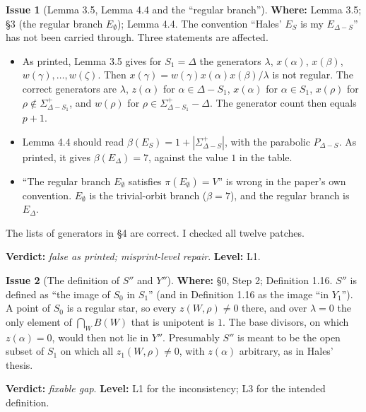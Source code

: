 \documentclass[12pt,letterpaper]{article}
\newcommand{\Lv}[1]{\textsf{L#1}}
\newcommand{\verdict}[1]{\textbf{Verdict:} \emph{#1}.}
\newcommand{\level}[1]{\textbf{Level:} #1.}
\newcommand{\loc}[1]{\textbf{Where:} #1.}
\theoremstyle{definition}
\newtheorem{issue}{Issue}[section]
\begin{document}
\begin{issue}[Lemma 3.5, Lemma 4.4 and the ``regular branch'']\label{iss:richardson}
\loc{Lemma 3.5; \S3 (the regular branch $E_\emptyset$); Lemma 4.4}
The convention ``Hales' $E_S$ is my $E_{\Delta-S}$'' has not been carried
through. Three statements are affected.
\begin{itemize}
\item As printed, Lemma 3.5 gives for $S_1=\Delta$ the generators $\lambda$,
$x(\alpha)$, $x(\beta)$, $w(\gamma),\dots,w(\zeta)$. Then
$x(\gamma)=w(\gamma)x(\alpha)x(\beta)/\lambda$ is not regular. The correct
generators are $\lambda$, $z(\alpha)$ for $\alpha\in\Delta-S_1$, $x(\alpha)$
for $\alpha\in S_1$, $x(\rho)$ for $\rho\notin\Sigma^+_{\Delta-S_1}$, and
$w(\rho)$ for $\rho\in\Sigma^+_{\Delta-S_1}-\Delta$. The generator count then
equals $p+1$.
\item Lemma 4.4 should read $\beta(E_S)=1+|\Sigma^+_{\Delta-S}|$, with the
parabolic $P_{\Delta-S}$. As printed, it gives $\beta(E_\Delta)=7$, against
the value $1$ in the table.
\item ``The regular branch $E_\emptyset$ satisfies $\pi(E_\emptyset)=V$'' is
wrong in the paper's own convention. $E_\emptyset$ is the trivial-orbit branch
($\beta=7$), and the regular branch is $E_\Delta$.
\end{itemize}
The lists of generators in \S4 are correct. I checked all twelve patches.

\verdict{false as printed; misprint-level repair}
\level{\Lv{1}}
\end{issue}

\begin{issue}[The definition of $S''$ and $Y''$]\label{iss:Spp}
\loc{\S0, Step 2; Definition 1.16}
$S''$ is defined as ``the image of $S_0$ in $S_1$'' (and in Definition 1.16
as the image ``in $Y_1$''). A point of $S_0$ is a regular star, so every
$z(W,\rho)\neq0$ there, and over $\lambda=0$ the only element of
$\bigcap_W B(W)$ that is unipotent is $1$. The base divisors, on which
$z(\alpha)=0$, would then not lie in $Y''$. Presumably $S''$ is meant to be the
open subset of $S_1$ on which all $z_1(W,\rho)\neq0$, with $z(\alpha)$
arbitrary, as in Hales' thesis.

\verdict{fixable gap}
\level{\Lv{1} for the inconsistency; \Lv{3} for the intended definition}
\end{issue}
\end{document}
